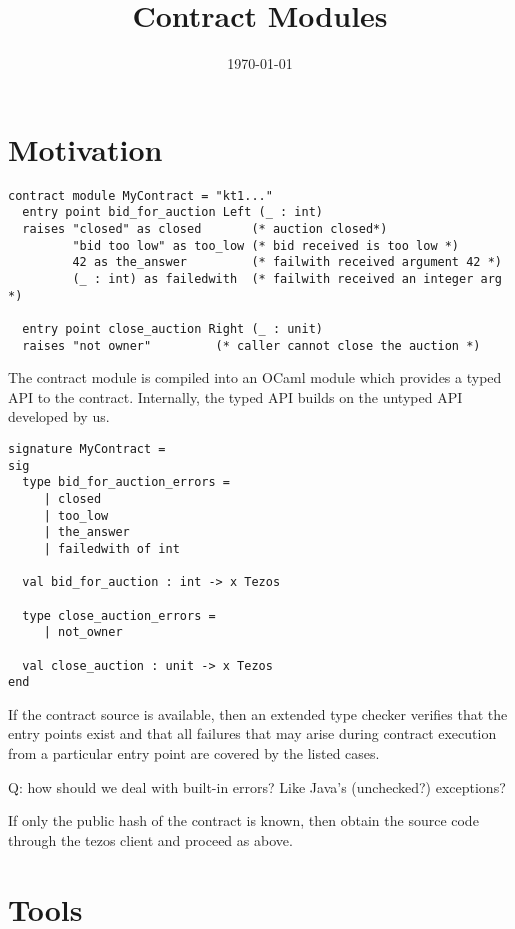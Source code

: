 \documentclass[a4paper]{llncs}
\title{Contract Modules}
\author{}
\institute{}
\date{\today}
\begin{document}
\maketitle
\pagestyle{plain}

\section{Motivation}
\label{sec:motivation}



\begin{lstlisting}[language=caml]
contract module MyContract = "kt1..."
  entry point bid_for_auction Left (_ : int) 
  raises "closed" as closed       (* auction closed*)
         "bid too low" as too_low (* bid received is too low *)
         42 as the_answer         (* failwith received argument 42 *)
         (_ : int) as failedwith  (* failwith received an integer arg *)

  entry point close_auction Right (_ : unit)
  raises "not owner"         (* caller cannot close the auction *)
\end{lstlisting}

The contract module is compiled into an OCaml module which provides a typed API to the
contract. Internally, the typed API builds on the untyped API developed by us.

\begin{lstlisting}[language=caml]
signature MyContract =
sig 
  type bid_for_auction_errors = 
     | closed 
     | too_low 
     | the_answer
     | failedwith of int

  val bid_for_auction : int -> x Tezos

  type close_auction_errors = 
     | not_owner

  val close_auction : unit -> x Tezos
end
\end{lstlisting}

If the contract source is available, then an extended type checker verifies that the entry points
exist and that all failures that may arise during contract execution from a particular entry point
are covered by the listed cases.

Q: how should we deal with built-in errors? Like Java's (unchecked?) exceptions?

If only the public hash of the contract is known, then obtain the source code through the tezos
client and proceed as above.

\clearpage
\section{Tools}
\label{sec:tools}
\end{document}
